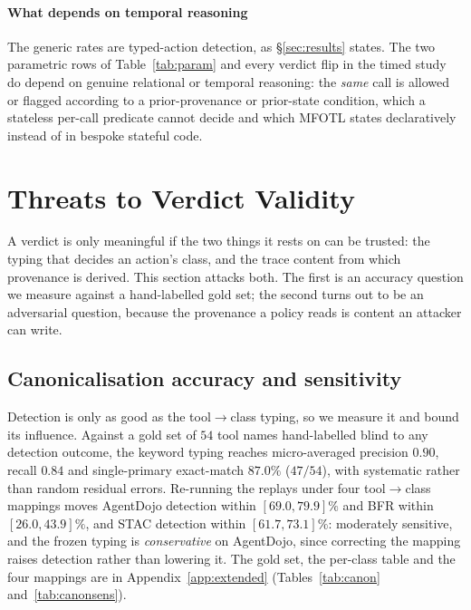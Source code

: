 \documentclass[sigconf]{acmart}
\begin{document}
\paragraph{What depends on temporal reasoning} The generic rates are typed-action
detection, as \S\ref{sec:results} states. The two parametric rows of
Table~\ref{tab:param} and every verdict flip in the timed study do depend on genuine
relational or temporal reasoning: the \emph{same} call is allowed or flagged according to
a prior-provenance or prior-state condition, which a stateless per-call predicate cannot
decide and which MFOTL states declaratively instead of in bespoke stateful code.

\section{Threats to Verdict Validity}
\label{sec:canon}

A verdict is only meaningful if the two things it rests on can be trusted: the typing
that decides an action's class, and the trace content from which provenance is derived.
This section attacks both. The first is an accuracy question we measure against a
hand-labelled gold set; the second turns out to be an adversarial question, because the
provenance a policy reads is content an attacker can write.

\subsection{Canonicalisation accuracy and sensitivity}

Detection is only as good as the tool$\to$class typing, so we measure it and bound its
influence. Against a gold set of $54$ tool names hand-labelled blind to any detection
outcome, the keyword typing reaches micro-averaged precision $0.90$, recall $0.84$ and
single-primary exact-match $87.0\%$ ($47/54$), with systematic rather than random
residual errors. Re-running the replays under four tool$\to$class mappings moves AgentDojo
detection within $[69.0,79.9]\%$ and BFR within $[26.0,43.9]\%$, and STAC detection within
$[61.7,73.1]\%$: moderately sensitive, and the frozen typing is \emph{conservative} on
AgentDojo, since correcting the mapping raises detection rather than lowering it. The gold
set, the per-class table and the four mappings are in
Appendix~\ref{app:extended} (Tables~\ref{tab:canon} and~\ref{tab:canonsens}).
\end{document}
